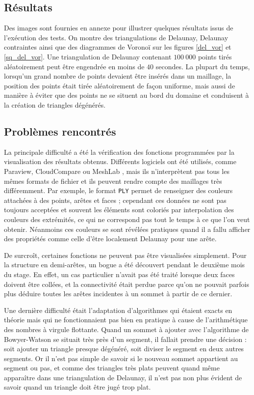 \documentclass[12pt,a4paper]{report}
\begin{document}
\subsection{Résultats}

Des images sont fournies en annexe pour illustrer quelques résultats issus de l'exécution des tests. On montre des triangulations de Delaunay, Delaunay contraintes ainsi que des diagrammes de Voronoï sur les figures \ref{del_vor} et \ref{sq_del_vor}. Une triangulation de Delaunay contenant $100\ 000$ points tirés aléatoirement peut être engendrée en moins de $40$ secondes. La plupart du temps, lorsqu'un grand nombre de points devaient être insérés dans un maillage, la position des points était tirée aléatoirement de façon uniforme, mais aussi de manière à éviter que des points ne se situent au bord du domaine et conduisent à la création de triangles dégénérés.

\subsection{Problèmes rencontrés}

La principale difficulté a été la vérification des fonctions programmées par la visualisation des résultats obtenus. Différents logiciels ont été utilisés, comme Paraview, CloudCompare ou MeshLab \cite{Paraview, CloudCompare, MeshLab}, mais ils n'interprètent pas tous les mêmes formats de fichier et ils peuvent rendre compte des maillages très différemment. Par exemple, le format \verb+PLY+ permet de renseigner des couleurs attachées à des points, arêtes et faces ; cependant ces données ne sont pas toujours acceptées et souvent les éléments sont coloriés par interpolation des couleurs des extrémités, ce qui ne correspond pas tout le temps à ce que l'on veut obtenir. Néanmoins ces couleurs se sont révélées pratiques quand il a fallu afficher des propriétés comme celle d'être localement Delaunay pour une arête.

De surcroît, certaines fonctions ne peuvent pas être visualisées simplement. Pour la structure en demi-arêtes, un bogue a été découvert pendant le deuxième mois du stage. En effet, un cas particulier n'avait pas été traité lorsque deux faces doivent être collées, et la connectivité était perdue parce qu'on ne pouvait parfois plus déduire toutes les arêtes incidentes à un sommet à partir de ce dernier.

Une dernière difficulté était l'adaptation d'algorithmes qui étaient exacts en théorie mais qui ne fonctionnaient pas bien en pratique à cause de l'arithmétique des nombres à virgule flottante. Quand un sommet à ajouter avec l'algorithme de Bowyer-Watson se situait très près d'un segment, il fallait prendre une décision : soit ajouter un triangle presque dégénéré, soit diviser le segment en deux autres segments. Or il n'est pas simple de savoir si le nouveau sommet appartient au segment ou pas, et comme des triangles très plats peuvent quand même apparaître dans une triangulation de Delaunay, il n'est pas non plus évident de savoir quand un triangle doit être jugé \og trop plat\fg{}.
\end{document}
